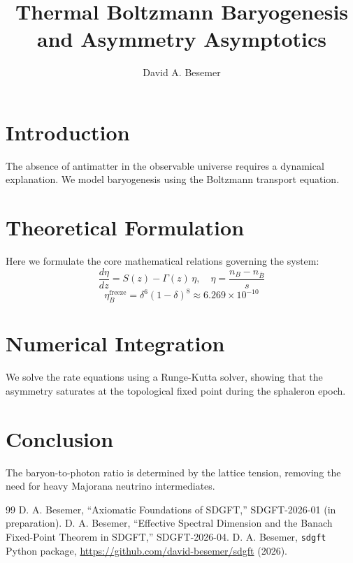 \documentclass[a4paper,11pt]{article}
\begin{document}
\title{Thermal Boltzmann Baryogenesis and Asymmetry Asymptotics}

\author{David A. Besemer}



\maketitle

\section{Introduction}
The absence of antimatter in the observable universe requires a dynamical explanation. We model baryogenesis using the Boltzmann transport equation.

\section{Theoretical Formulation}
Here we formulate the core mathematical relations governing the system:
\begin{equation}
  \frac{d\eta}{dz} = S(z) - \Gamma(z)\,\eta, \quad \eta = \frac{n_B - n_{\bar{B}}}{s}
\end{equation}
\begin{equation}
  \eta_B^{\text{freeze}} = \delta^6 (1-\delta)^8 \approx 6.269 \times 10^{-10}
\end{equation}
\section{Numerical Integration}
We solve the rate equations using a Runge-Kutta solver, showing that the asymmetry saturates at the topological fixed point during the sphaleron epoch.

\section{Conclusion}
The baryon-to-photon ratio is determined by the lattice tension, removing the need for heavy Majorana neutrino intermediates.



\begin{thebibliography}{99}
 D. A. Besemer, ``Axiomatic Foundations of SDGFT,'' SDGFT-2026-01 (in preparation).
 D. A. Besemer, ``Effective Spectral Dimension and the Banach Fixed-Point Theorem in SDGFT,'' SDGFT-2026-04.
 D. A. Besemer, \texttt{sdgft} Python package, \url{https://github.com/david-besemer/sdgft} (2026).
\end{thebibliography}
\end{document}
